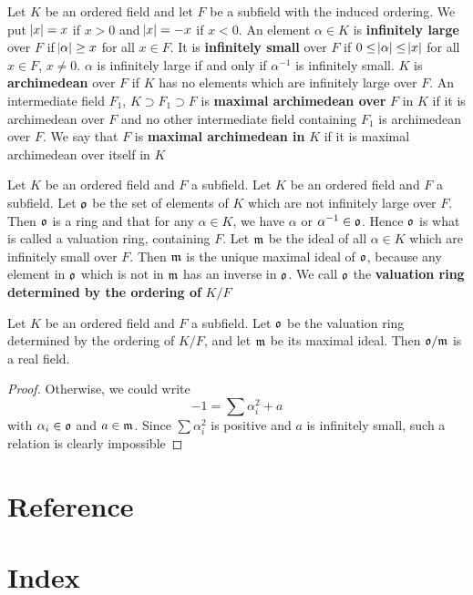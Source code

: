\documentclass[11pt]{article}
\begin{document}
Let \(K\) be an ordered field and let \(F\) be a subfield with the induced
ordering. We put \(\abs{x}=x\) if \(x>0\) and \(\abs{x}=-x\) if \(x<0\). An
element \(\alpha\in K\) is \textbf{infinitely large} over \(F\) if \(\abs{\alpha}\ge x\) for all
\(x\in F\). It is \textbf{infinitely small} over \(F\) if \(0\le\abs{\alpha}\le\abs{x}\) for
all \(x\in F\), \(x\neq0\). \(\alpha\) is infinitely large if and only if \(\alpha^{-1}\) is
infinitely small. \(K\) is \textbf{archimedean} over \(F\) if \(K\) has no elements
which are infinitely large over \(F\). An intermediate field \(F_1\),
\(K\supset F_1\supset F\) is \textbf{maximal archimedean over} \(F\) in \(K\) if it is
archimedean over \(F\) and no other intermediate field containing \(F_1\) is
archimedean over \(F\). We say that \(F\) is \textbf{maximal archimedean in} \(K\)
if it is maximal archimedean over itself in \(K\)

Let \(K\) be an ordered field and \(F\) a subfield. Let \(K\) be an ordered
field and \(F\) a subfield. Let \(\fo\) be the set of elements of \(K\)
which are not infinitely large over \(F\). Then \(\fo\) is a ring and that
for any \(\alpha\in K\), we have \(\alpha\) or \(\alpha^{-1}\in\fo\). Hence \(\fo\) is what is
called a valuation ring, containing \(F\). Let \(\fm\) be the ideal of all
\(\alpha\in K\) which are infinitely small over \(F\). Then \(\fm\) is the unique
maximal ideal of \(\fo\), because any element in \(\fo\) which is not in
\(\fm\) has an inverse in \(\fo\). We call \(\fo\) the
\textbf{valuation ring determined by the ordering of} \(K/F\)

\begin{proposition}[]
Let \(K\) be an ordered field and \(F\) a subfield. Let \(\fo\) be the
valuation ring determined by the ordering of \(K/F\), and let \(\fm\) be its
maximal ideal. Then \(\fo/\fm\) is a real field.
\end{proposition}

\begin{proof}
Otherwise, we could write
\begin{equation*}
-1=\displaystyle\sum\alpha_i^2+a
\end{equation*}
with \(\alpha_i\in\fo\) and \(a\in\fm\). Since \(\sum\alpha_i^2\) is positive and \(a\) is
infinitely small, such a relation is clearly impossible
\end{proof}

\section{Reference}
\label{sec:orga90a4db}


\section{Index}
\label{sec:orgddace79}
\renewcommand{\indexname}{}
\printindex
\appendix
\end{document}
